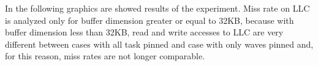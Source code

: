 \begin{table}[htbp]
\centering%
\hspace{4em}
\label{tab:assignment}
\caption{cpu assignment performed}
\end{table}

In the following graphics are showed results of the experiment. Miss rate on LLC is analyzed only for buffer dimension greater or equal to 32KB, because 
with buffer dimension less than 32KB, read and write accesses to LLC are very different between cases with all task pinned and case with only waves pinned 
and, for this reason, miss rates are not longer comparable.

